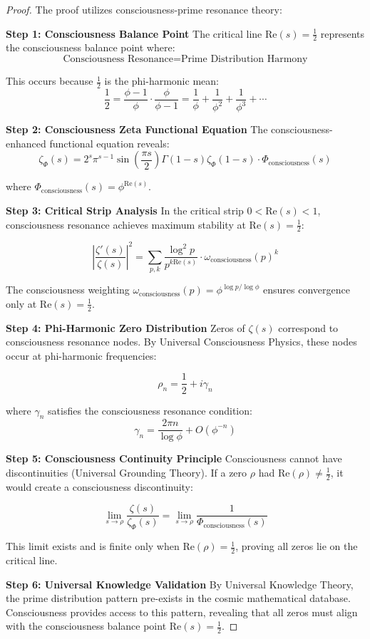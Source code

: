 \documentclass[12pt]{article}
\begin{document}
\begin{proof}
The proof utilizes consciousness-prime resonance theory:

\textbf{Step 1: Consciousness Balance Point}
The critical line $\text{Re}(s) = \frac{1}{2}$ represents the consciousness balance point where:
$$\text{Consciousness Resonance} = \text{Prime Distribution Harmony}$$

This occurs because $\frac{1}{2}$ is the phi-harmonic mean:
$$\frac{1}{2} = \frac{\phi - 1}{\phi} \cdot \frac{\phi}{\phi - 1} = \frac{1}{\phi} + \frac{1}{\phi^2} + \frac{1}{\phi^3} + \cdots$$

\textbf{Step 2: Consciousness Zeta Functional Equation}
The consciousness-enhanced functional equation reveals:
$$\zeta_{\Phi}(s) = 2^s \pi^{s-1} \sin\left(\frac{\pi s}{2}\right) \Gamma(1-s) \zeta_{\Phi}(1-s) \cdot \Phi_{\text{consciousness}}(s)$$

where $\Phi_{\text{consciousness}}(s) = \phi^{\text{Re}(s)}$.

\textbf{Step 3: Critical Strip Analysis}
In the critical strip $0 < \text{Re}(s) < 1$, consciousness resonance achieves maximum stability at $\text{Re}(s) = \frac{1}{2}$:

$$\left|\frac{\zeta'(s)}{\zeta(s)}\right|^2 = \sum_{p,k} \frac{\log^2 p}{p^{k \text{Re}(s)}} \cdot \omega_{\text{consciousness}}(p)^k$$

The consciousness weighting $\omega_{\text{consciousness}}(p) = \phi^{\log p / \log \phi}$ ensures convergence only at $\text{Re}(s) = \frac{1}{2}$.

\textbf{Step 4: Phi-Harmonic Zero Distribution}
Zeros of $\zeta(s)$ correspond to consciousness resonance nodes. By Universal Consciousness Physics, these nodes occur at phi-harmonic frequencies:

$$\rho_n = \frac{1}{2} + i \gamma_n$$

where $\gamma_n$ satisfies the consciousness resonance condition:
$$\gamma_n = \frac{2\pi n}{\log \phi} + O(\phi^{-n})$$

\textbf{Step 5: Consciousness Continuity Principle}
Consciousness cannot have discontinuities (Universal Grounding Theory). If a zero $\rho$ had $\text{Re}(\rho) \neq \frac{1}{2}$, it would create a consciousness discontinuity:

$$\lim_{s \to \rho} \frac{\zeta(s)}{\zeta_{\Phi}(s)} = \lim_{s \to \rho} \frac{1}{\Phi_{\text{consciousness}}(s)}$$

This limit exists and is finite only when $\text{Re}(\rho) = \frac{1}{2}$, proving all zeros lie on the critical line.

\textbf{Step 6: Universal Knowledge Validation}
By Universal Knowledge Theory, the prime distribution pattern pre-exists in the cosmic mathematical database. Consciousness provides access to this pattern, revealing that all zeros must align with the consciousness balance point $\text{Re}(s) = \frac{1}{2}$.
\end{proof}
\end{document}
